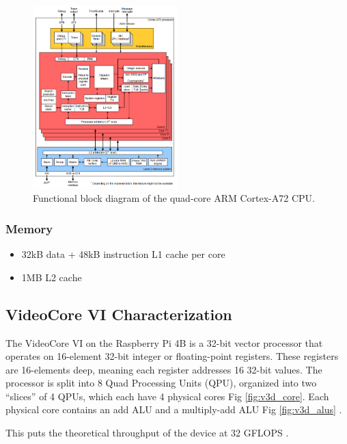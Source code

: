 \documentclass[12pt]{article}
\begin{document}
\begin{figure}[h]
\centering
\includegraphics[width=0.5\textwidth]{A72_FBD.png} %
\caption{Functional block diagram of the quad-core ARM Cortex-A72 CPU.}
\label{fig:A72_fbd}
\end{figure}

\subsubsection{Memory}

\begin{itemize}
\item 32kB data + 48kB instruction L1 cache per core
\item 1MB L2 cache
\end{itemize}

\subsection{VideoCore VI Characterization}

The VideoCore VI on the Raspberry Pi 4B is a 32-bit vector processor that operates on 16-element 32-bit integer or floating-point registers. These registers are 16-elements deep, meaning each register addresses 16 32-bit values. The processor is split into 8 Quad Processing Units (QPU), organized into two ``slices'' of 4 QPUs, which each have 4 physical cores Fig \ref{fig:v3d_core}. Each physical core contains an add ALU and a multiply-add ALU Fig \ref{fig:v3d_alus} \cite{rijnders2021v3dlib}. 

This puts the theoretical throughput of the device at 32 GFLOPS \cite{pyvideocore6}.
\end{document}
